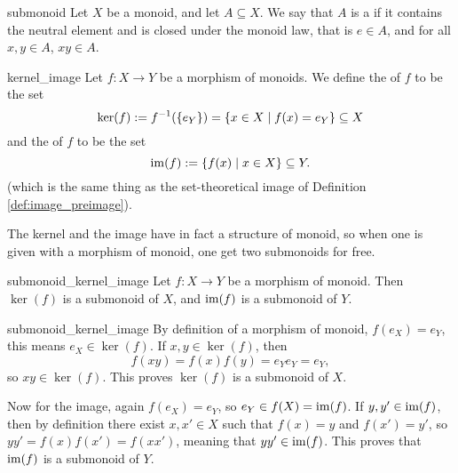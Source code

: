 \begin{cdef}{}{submonoid}
    Let \( X \) be a monoid, and let \( A \subseteq X \). We say that \( A \) is a  if it contains the neutral element and is closed under the monoid law, that is \( e \in A \), and for all \( x, y \in A \), \( xy \in A \).
\end{cdef}

\begin{cdef}{}{kernel_image}
    Let \( f : X \to Y \) be a morphism of monoids. We define the  of \( f \) to be the set
    \begin{equation*}
        \ker(f) := f^{-1}(\{ e_Y \}) = \{ x \in X \mid f(x) = e_Y \} \subseteq X
    \end{equation*}
    and the  of \( f \) to be the set
    \begin{equation*}
        \operatorname{im}(f) := \{ f(x) \mid x \in X \} \subseteq Y.
    \end{equation*}
    (which is the same thing as the set-theoretical image of Definition \ref{def:image_preimage}).
\end{cdef}

The kernel and the image have in fact a structure of monoid, so when one is given with a morphism of monoid, one get two submonoids for free.

\begin{clem}{}{submonoid_kernel_image}
    Let \( f : X \to Y  \) be a morphism of monoid. Then \( \ker(f) \) is a submonoid of \( X \), and \( \operatorname{im}(f) \) is a submonoid of \( Y \).
\end{clem}
\begin{lemproof}{submonoid_kernel_image}
    By definition of a morphism of monoid, \( f(e_X) = e_Y \), this means \( e_X \in \ker(f) \). If \( x, y \in \ker(f) \), then 
    \begin{equation*}
        f(xy) = f(x)f(y) = e_Ye_Y = e_Y,
    \end{equation*}
    so \( xy \in \ker(f) \). This proves \( \ker(f) \) is a submonoid of \( X \).

    Now for the image, again \( f(e_X) = e_Y \), so \( e_Y \in f(X) = \operatorname{im}(f) \). If \( y, y' \in \operatorname{im}(f) \), then by definition there exist \( x, x' \in X \) such that \( f(x) = y \) and \( f(x') = y' \), so \( yy' = f(x)f(x') = f(xx') \), meaning that \( yy' \in \operatorname{im}(f) \). This proves that \( \operatorname{im}(f) \) is a submonoid of \( Y \). 
\end{lemproof}

